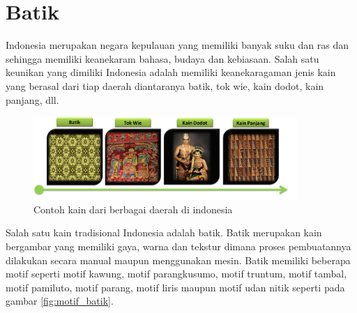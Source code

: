 \section{Batik}
Indonesia merupakan negara kepulauan yang memiliki banyak suku dan ras dan sehingga memiliki keanekaram bahasa, budaya dan kebiasaan. Salah satu keunikan yang dimiliki Indonesia adalah memiliki keanekaragaman jenis kain yang berasal dari tiap daerah diantaranya batik, tok wie, kain dodot, kain panjang, dll.

\begin{figure}[htp]
	\centering
	\includegraphics[width=10cm]{pics/kain_indonesia}
	\caption{Contoh kain dari berbagai daerah di indonesia}
	\label{fig:kain_indonesia}
\end{figure}
Salah satu kain tradisional Indonesia adalah batik. Batik merupakan kain bergambar yang memiliki gaya, warna dan tekstur dimana proses pembuatannya dilakukan secara manual maupun menggunakan mesin. Batik memiliki beberapa motif seperti motif kawung, motif parangkusumo, motif truntum, motif tambal, motif pamiluto, motif parang, motif liris maupun motif udan nitik seperti pada gambar \ref{fig:motif_batik}.

